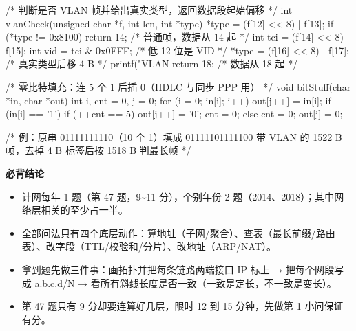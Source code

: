 \documentclass[10pt,a4paper]{ctexart}
\begin{document}
\begin{codebox}
/* 判断是否 VLAN 帧并给出真实类型，返回数据段起始偏移 */
int vlanCheck(unsigned char *f, int len, int *type) {
    *type = (f[12] << 8) | f[13];
    if (*type != 0x8100) return 14;          /* 普通帧，数据从 14 起 */
    int tci = (f[14] << 8) | f[15];
    int vid = tci & 0x0FFF;                  /* 低 12 位是 VID */
    *type = (f[16] << 8) | f[17];            /* 真实类型后移 4 B */
    printf("VLAN %
    return 18;                               /* 数据从 18 起 */
}

/* 零比特填充：连 5 个 1 后插 0（HDLC 与同步 PPP 用） */
void bitStuff(char *in, char *out) {
    int i, cnt = 0, j = 0;
    for (i = 0; in[i]; i++) {
        out[j++] = in[i];
        if (in[i] == '1') { if (++cnt == 5) { out[j++] = '0'; cnt = 0; } }
        else cnt = 0;
    }
    out[j] = 0;
}

/* 例：原串 01111111110（10 个 1）填成 01111101111100
      带 VLAN 的 1522 B 帧，去掉 4 B 标签后按 1518 B 判最长帧 */
\end{codebox}




\textbf{必背结论}

\begin{itemize}

\item 计网每年 1 题（第 47 题，9\textasciitilde{}11 分），个别年份 2 题（2014、2018）；其中网络层相关的至少占一半。

\item 全部问法只有四个底层动作：算地址（子网/聚合）、查表（最长前缀/路由表）、改字段（TTL/校验和/分片）、改地址（ARP/NAT）。

\item 拿到题先做三件事：画拓扑并把每条链路两端接口 IP 标上 → 把每个网段写成 a.b.c.d/N → 看所有斜线长度是否一致（一致是定长，不一致是变长）。

\item 第 47 题只有 9 分却要连算好几层，限时 12 到 15 分钟，先做第 1 小问保证有分。

\end{itemize}
\end{document}
